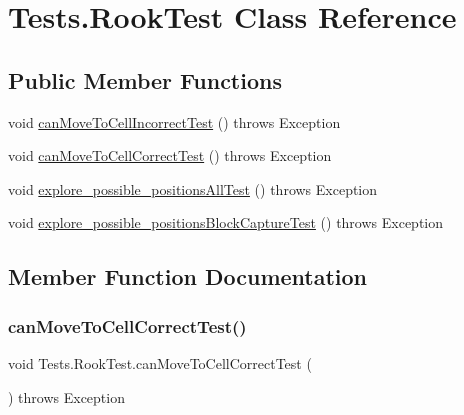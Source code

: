 \hypertarget{class_tests_1_1_rook_test}{}\section{Tests.\+Rook\+Test Class Reference}
\label{class_tests_1_1_rook_test}
\subsection*{Public Member Functions}
\begin{DoxyCompactItemize}
\item 
void \hyperlink{class_tests_1_1_rook_test_af0973359c90be81d5789430155def5d5}{can\+Move\+To\+Cell\+Incorrect\+Test} ()  throws Exception 
\item 
void \hyperlink{class_tests_1_1_rook_test_a02bb2ab60818cd4d1746f37c31e70ecc}{can\+Move\+To\+Cell\+Correct\+Test} ()  throws Exception 
\item 
void \hyperlink{class_tests_1_1_rook_test_a53cd669ac179cb3c550cb862b09374c0}{explore\+\_\+possible\+\_\+positions\+All\+Test} ()  throws Exception 
\item 
void \hyperlink{class_tests_1_1_rook_test_ac9c944f9e194ae63eebfff8ff99a0284}{explore\+\_\+possible\+\_\+positions\+Block\+Capture\+Test} ()  throws Exception 
\end{DoxyCompactItemize}


\subsection{Member Function Documentation}
\mbox{\label{class_tests_1_1_rook_test_a02bb2ab60818cd4d1746f37c31e70ecc}} 
\subsubsection{\texorpdfstring{can\+Move\+To\+Cell\+Correct\+Test()}{canMoveToCellCorrectTest()}}
{\footnotesize\ttfamily void Tests.\+Rook\+Test.\+can\+Move\+To\+Cell\+Correct\+Test (\begin{DoxyParamCaption}{ }\end{DoxyParamCaption}) throws Exception\hspace{0.3cm}{\ttfamily [inline]}}

